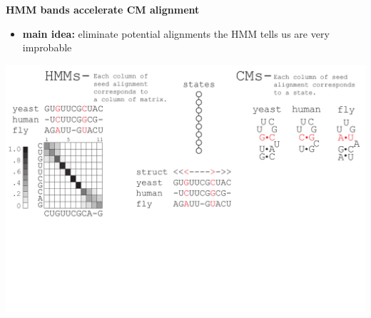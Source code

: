 \documentclass[landscape]{slides}
\begin{document}
\begin{slide}
\begin{minipage}{4in}
\begin{center}
\end{center}
\vspace{1.5in}
\end{minipage}
\end{slide}

\begin{slide}
\begin{center}

\textbf{HMM bands accelerate CM alignment}
\end{center}
\medskip
\small
\begin{itemize}
\item
\textbf{main idea:} eliminate potential alignments the HMM tells us are very improbable
\end{itemize}
\begin{center}
\includegraphics[width=8in]{figs/post_hmm_to_cm_map2_layer2}
\end{center}
\vfill
\end{slide}
\end{document}
